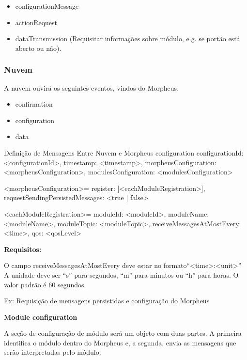 \begin{itemize}
\item configurationMessage
\item actionRequest
\item dataTransmission (Requisitar informações sobre módulo, e.g. se portão está aberto ou não).
\end{itemize}

\subsubsection{Nuvem}
A nuvem ouvirá os seguintes eventos, vindos do Morpheus.

\begin{itemize}
\item confirmation
\item configuration
\item data
\end{itemize}

Definição de Mensagens Entre Nuvem e Morpheus
configuration
{
    configurationId: \textless configurationId\textgreater ,
    timestamp: \textless timestamp\textgreater ,
    morpheusConfiguration: \textless morpheusConfiguration\textgreater ,
    modulesConfiguration: \textless modulesConfiguration\textgreater
}

\textless morpheusConfiguration\textgreater  =
{
    	register: [\textless eachModuleRegistration\textgreater ],
requestSendingPersistedMessages: \textless true | false\textgreater
}

\textless eachModuleRegistration\textgreater  =
{
moduleId: \textless moduleId\textgreater ,
            moduleName: \textless moduleName\textgreater ,
            moduleTopic: \textless moduleTopic\textgreater ,
            receiveMessagesAtMostEvery: \textless time\textgreater ,
            qos: \textless qosLevel\textgreater
 }

\textbf{Requisitos:}

O campo receiveMessagesAtMostEvery deve estar no formato“\textless time\textgreater :\textless unit\textgreater ”
A unidade deve ser “s” para segundos, “m” para minutos ou “h” para horas. O valor padrão é 60 segundos.

Ex: Requisição de mensagens persistidas e configuração do Morpheus

\textbf{Module configuration}

A seção de configuração de módulo será um objeto com duas partes. A primeira identifica o módulo dentro do Morpheus e, a segunda, envia as mensagens que serão interpretadas pelo módulo.

